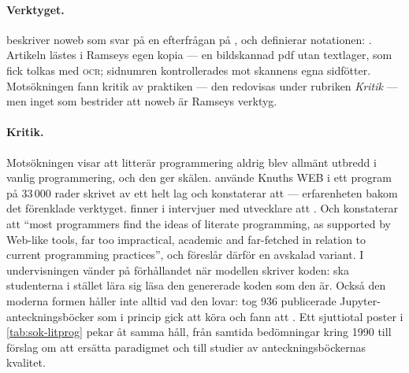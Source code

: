 \paragraph{Verktyget.}  \textcite{Ramsey1994Noweb} beskriver noweb som
svar på en efterfrågan på , och
definierar notationen: .  Artikeln
lästes i Ramseys egen kopia --- en bildskannad pdf utan textlager, som
fick tolkas med \textsc{ocr}; sidnumren kontrollerades mot skannens egna
sidfötter.  Motsökningen fann kritik av praktiken --- den redovisas
under rubriken \emph{Kritik} --- men inget som bestrider att noweb är
Ramseys verktyg.

\paragraph{Kritik.}  Motsökningen visar att litterär programmering aldrig
blev allmänt utbredd i vanlig programmering, och den ger skälen.
\textcite{ramseyMarceau1991} använde Knuths WEB i ett program på
33\,000 rader skrivet av ett helt lag och konstaterar att
 --- erfarenheten bakom det förenklade verktyget.
\textcite{park2018} finner i intervjuer med utvecklare att
.  Och
\textcite{normark2000} konstaterar att \enquote{most programmers find the
ideas of literate programming, as supported by Web-like tools, far too
impractical, academic and far-fetched in relation to current programming
practices}, och föreslår därför en avskalad variant.  I undervisningen
vänder \textcite{rosiene2024} på förhållandet när modellen skriver koden:
 ska studenterna i stället lära sig läsa den genererade koden
som den är.  Också den moderna
formen håller inte alltid vad den lovar: \textcite{wang2020} tog 936
publicerade Jupyter-anteckningsböcker som i princip gick att köra och fann
att .  Ett sjuttiotal poster
i \cref{tab:sok-litprog} pekar åt samma håll, från samtida bedömningar
kring 1990 till förslag om att ersätta paradigmet och till studier av
anteckningsböckernas kvalitet.

